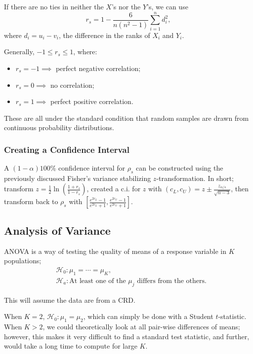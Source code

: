 \documentclass[12pt]{article}
\begin{document}
If there are no ties in neither the $X$'s nor the $Y$'s, we can use \[r_s = 1 - \frac{6}{n(n^2-1)}\sum_{i=1}^n d_i^2,\] where $d_i = u_i - v_i$, the difference in the ranks of $X_i$ and $Y_i$. 

Generally, $-1 \leq r_s \leq 1$, where: \begin{itemize}
    \item $r_s = -1 \implies$ perfect negative correlation;
    \item $r_s = 0 \implies$ no correlation;
    \item $r_s = 1 \implies$ perfect positive correlation.
\end{itemize}

These are all under the standard condition that random samples are drawn from continuous probability distributions.

\subsubsection{Creating a Confidence Interval}

A $(1-\alpha)100\%$ confidence interval for $\rho_s$ can be constructed using the previously discussed Fisher's variance stabilizing $z$-transformation. In short; transform $z = \frac{1}{2}\ln\left(\frac{1+r_s}{1-r_s}\right)$, created a c.i. for $z$ with $(c_L, c_U) = z \pm \frac{z_{\alpha/s}}{\sqrt{n-3}}$, then transform back to $\rho_s$ with $\left[\frac{e^{2c_L}-1}{e^{2c_L}+1}, \frac{e^{2c_U}-1}{e^{2c_U}+1}\right]$.

\subsection{Analysis of Variance}

ANOVA is a way of testing the quality of means of a response variable in $K$ populations; \begin{align*}
    &\mathcal{H}_0: \mu_1 = \cdots = \mu_K,\\
    &\mathcal{H}_a: \text{At least one of the } \mu_j \text{ differs from the others.}
\end{align*}

This will assume the data are from a CRD.

When $K = 2$, $\mathcal{H}_0: \mu_1 = \mu_2$, which can simply be done with a Student $t$-statistic. When $K>2$, we could theoretically look at all pair-wise differences of means; however, this makes it very difficult to find a standard test statistic, and further, would take a long time to compute for large $K$.
\end{document}
